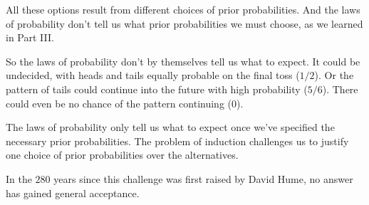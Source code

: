 \documentclass[justified]{tufte-book}
\theoremstyle{definition}
\theoremstyle{definition}
\theoremstyle{definition}
\theoremstyle{remark}
\begin{document}
All these options result from different choices of prior probabilities.
And the laws of probability don't tell us what prior probabilities we
must choose, as we learned in Part III.

So the laws of probability don't by themselves tell us what to expect.
It could be undecided, with heads and tails equally probable on the
final toss (\(1/2\)). Or the pattern of tails could continue into the
future with high probability (\(5/6\)). There could even be no chance of
the pattern continuing (\(0\)).

The laws of probability only tell us what to expect once we've specified
the necessary prior probabilities. The problem of induction challenges
us to justify one choice of prior probabilities over the alternatives.

In the \(280\) years since this challenge was first raised by David
Hume, no answer has gained general acceptance.
\end{document}
